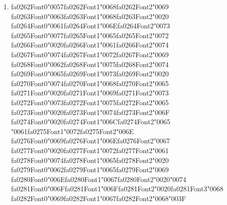 \documentclass[12pt]{article}
\begin{document}
\begin{enumerate}[label=Q\arabic*.]
 \begin{enumerate}[label=(\Alph*)]
     \item Cross-entropy loss misconfigured
     \item The final layer is using Softmax without temperature scaling
     \item Learning rate too high
     \item All pre-activation values are negative in the first layer
 \end{enumerate}
 
 \item {\csname fa0262Font0\endcsname\char"0057}{\csname fa0262Font1\endcsname\char"0068}{\csname fa0262Font2\endcsname\char"0069} {\csname fa0263Font0\endcsname\char"0063}{\csname fa0263Font1\endcsname\char"0068}{\csname fa0263Font2\endcsname\char"0020} {\csname fa0264Font0\endcsname\char"0061}{\csname fa0264Font1\endcsname\char"006E}{\csname fa0264Font2\endcsname\char"0073} {\csname fa0265Font0\endcsname\char"0077}{\csname fa0265Font1\endcsname\char"0065}{\csname fa0265Font2\endcsname\char"0072} {\csname fa0266Font0\endcsname\char"0020}{\csname fa0266Font1\endcsname\char"0061}{\csname fa0266Font2\endcsname\char"0074} {\csname fa0267Font0\endcsname\char"0074}{\csname fa0267Font1\endcsname\char"0072}{\csname fa0267Font2\endcsname\char"0069} {\csname fa0268Font0\endcsname\char"0062}{\csname fa0268Font1\endcsname\char"0075}{\csname fa0268Font2\endcsname\char"0074} {\csname fa0269Font0\endcsname\char"0065}{\csname fa0269Font1\endcsname\char"0073}{\csname fa0269Font2\endcsname\char"0020} {\csname fa0270Font0\endcsname\char"0074}{\csname fa0270Font1\endcsname\char"0068}{\csname fa0270Font2\endcsname\char"0065} {\csname fa0271Font0\endcsname\char"0020}{\csname fa0271Font1\endcsname\char"0069}{\csname fa0271Font2\endcsname\char"0073} {\csname fa0272Font0\endcsname\char"0073}{\csname fa0272Font1\endcsname\char"0075}{\csname fa0272Font2\endcsname\char"0065} {\csname fa0273Font0\endcsname\char"0020}{\csname fa0273Font1\endcsname\char"0074}{\csname fa0273Font2\endcsname\char"006F} {\csname fa0274Font0\endcsname\char"0020}{\csname fa0274Font1\endcsname\char"006C}{\csname fa0274Font2\endcsname\char"0065} {\char"0061}{\csname fa0275Font1\endcsname\char"0072}{\csname fa0275Font2\endcsname\char"006E} {\csname fa0276Font0\endcsname\char"0069}{\csname fa0276Font1\endcsname\char"006E}{\csname fa0276Font2\endcsname\char"0067} {\csname fa0277Font0\endcsname\char"0020}{\csname fa0277Font1\endcsname\char"0072}{\csname fa0277Font2\endcsname\char"0061} {\csname fa0278Font0\endcsname\char"0074}{\csname fa0278Font1\endcsname\char"0065}{\csname fa0278Font2\endcsname\char"0020} {\csname fa0279Font0\endcsname\char"0062}{\csname fa0279Font1\endcsname\char"0065}{\csname fa0279Font2\endcsname\char"0069} {\csname fa0280Font0\endcsname\char"006E}{\csname fa0280Font1\endcsname\char"0067}{\csname fa0280Font2\endcsname\char"0020}{\char"0074} {\csname fa0281Font0\endcsname\char"006F}{\csname fa0281Font1\endcsname\char"006F}{\csname fa0281Font2\endcsname\char"0020}{\csname fa0281Font3\endcsname\char"0068} {\csname fa0282Font0\endcsname\char"0069}{\csname fa0282Font1\endcsname\char"0067}{\csname fa0282Font2\endcsname\char"0068}{\char"003F}

\end{enumerate}
\end{document}
